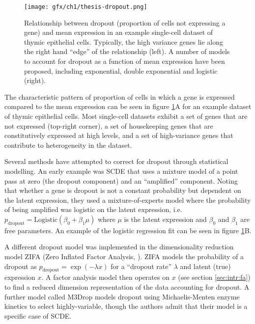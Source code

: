 \begin{figure}
\centering
  \texttt{[image: gfx/ch1/thesis-dropout.png]}
  \caption{Relationship between dropout (proportion of cells not expressing a gene) and mean expression in an example single-cell dataset of thymic epithelial cells. Typically, the high variance genes lie along the right hand ``edge'' of the relationship (left). A number of models to account for dropout as a function of mean expression have been proposed, including exponential, double exponential and logistic (right).} \label{fig:intro_dropout}
\end{figure}

The characteristic pattern of proportion of cells in which a gene is expressed compared to the mean expression can be seen in figure \ref{fig:intro_dropout}A for an example dataset of thymic epithelial cells. Most single-cell datasets exhibit a set of genes that are not expressed (top-right corner), a set of housekeeping genes that are constitutively expressed at high levels, and a set of high-variance genes that contribute to heterogeneity in the dataset.

Several methods have attempted to correct for dropout through statistical modelling. An early example was SCDE \cite{Kharchenko2014} that uses a mixture model of a point pass at zero (the dropout component) and an ``amplified'' component. Noting that whether a gene is dropout is not a constant probability but dependent on the latent expression, they used a mixture-of-experts model where the probability of being amplified was logistic on the latent expression, i.e. $p_{\text{dropout}} = \text{Logistic}(\beta_0 + \beta_1 \mu)$ where $\mu$ is the latent expression and $\beta_0$ and $\beta_1$ are free parameters. An example of the logistic regression fit can be seen in figure \ref{fig:intro_dropout}B.

A different dropout model was implemented in the dimensionality reduction model ZIFA (Zero Inflated Factor Analysis, \cite{pierson2015zifa}). ZIFA models the probability of a dropout as $p_{\text{dropout}} = \exp(-\lambda x)$ for a ``dropout rate'' $\lambda$ and latent (true) expression $x$. A factor analysis model then operates on $x$ (see section \ref{sec:intr:fa}) to find a reduced dimension representation of the data accounting for dropout. A further model called M3Drop \cite{Andrews2016-ij} models dropout using Michaelis-Menten enzyme kinetics to select highly-variable, though the authors admit that their model is a specific case of SCDE.

